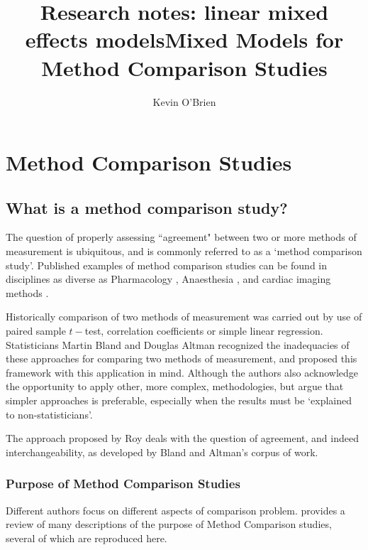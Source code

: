 \documentclass[12pt, a4paper]{report}
\title{Research notes: linear mixed effects models}
\author{ } \date{ }
\theoremstyle{plain}
\theoremstyle{definition}
\theoremstyle{remark}
\begin{document}
	\author{Kevin O'Brien}
	\title{Mixed Models for Method Comparison Studies}
	\tableofcontents
	
	\newpage
	\chapter{Method Comparison Studies}
	
	
	\section{What is a method comparison study?}


The question of properly assessing ``agreement" between two or more methods of measurement is ubiquitous, and is commonly referred to as a `method comparison study'. Published examples of method comparison studies can be found in disciplines
as diverse as Pharmacology \citep{ludbrook97}, Anaesthesia \citep{Myles}, and cardiac imaging methods \citep{Krumm}.
	
Historically comparison of two methods of measurement was carried out by use of paired sample $t-$test, correlation coefficients or simple linear regression. Statisticians Martin Bland and Douglas Altman recognized the inadequacies of these approaches for comparing two methods of measurement, and proposed this framework with this application in mind. Although the authors also acknowledge the opportunity to apply other, more complex, methodologies, but argue that simpler approaches is preferable, especially when the
results must be `explained to non-statisticians'.

 The approach proposed by Roy deals with the question of agreement, and indeed interchangeability, as developed by Bland and Altman's corpus of work.

	\subsection{Purpose of Method Comparison Studies}
	Different authors focus on different aspects of comparison problem. \citet{BXC2010} provides a review of many descriptions of the purpose of Method Comparison studies, several of which are reproduced here.
	
\end{document}
